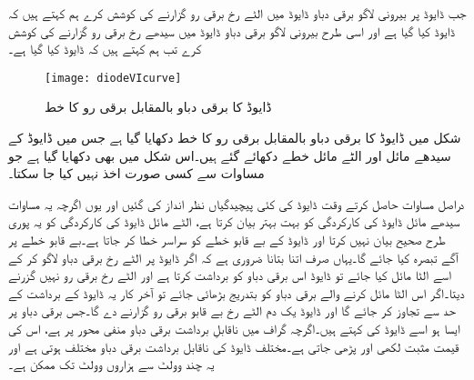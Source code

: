 جب ڈایوڈ پر بیرونی لاگو برقی دباو ڈایوڈ میں الٹے رخ برقی رو گزارنے کی کوشش کرے ہم کہتے ہیں کہ ڈایوڈ    کیا گیا ہے اور اسی طرح بیرونی لاگو برقی دباو ڈایوڈ میں سیدھے رخ برقی رو گزارنے کی کوشش کرے تب ہم کہتے ہیں کہ ڈایوڈ  کیا گیا ہے۔
\begin{figure}
\centering
\texttt{[image: diodeVIcurve]}
\caption{ڈایوڈ کا برقی دباو بالمقابل برقی رو کا خط}
\label{شکل_ڈایوڈ_برقی_دباو_بالمقابل_برقی_رو}
\end{figure}
شکل   میں ڈایوڈ کا برقی دباو بالمقابل برقی رو  کا خط دکھایا گیا ہے جس میں ڈایوڈ کے سیدھے مائل اور الٹے مائل خطے دکھائے گئے ہیں۔اس شکل میں  بھی دکھایا گیا ہے جو مساوات   سے کسی صورت اخذ نہیں کیا جا سکتا۔

دراصل مساوات   حاصل کرتے وقت ڈایوڈ کی کئی پیچیدگیاں نظر انداز کی گئیں اور یوں اگرچہ یہ مساوات سیدھے مائل ڈایوڈ کی کارکردگی کو بہت بہتر بیان کرتا ہے، الٹے مائل ڈایوڈ کی کارکردگی کو یہ پوری طرح صحیح بیان نہیں کرتا اور ڈایوڈ کے بے قابو خطے کو سراسر خطا کر جاتا ہے۔بے قابو خطے پر آگے تبصرہ کیا جائے گا۔یہاں صرف اتنا بتانا ضروری ہے کہ اگر ڈایوڈ پر الٹے رخ برقی دباو لاگو کر کے اسے الٹا مائل کیا جائے تو ڈایوڈ اس برقی دباو کو برداشت کرتا ہے اور الٹے رخ برقی رو نہیں گزرنے دیتا۔اگر اس الٹا مائل کرنے والے برقی دباو کو بتدریج بڑھائی جائے تو آخر کار یہ ڈایوڈ کے برداشت کے حد سے تجاوز کر جائے گا اور ڈایوڈ یک دم الٹے رخ بے قابو برقی رو گزارنے دے گا۔جس برقی دباو پر ایسا ہو اسے ڈایوڈ کی      کہتے ہیں۔اگرچہ گراف میں ناقابلِ برداشت برقی دباو منفی محور پر ہے، اس کی قیمت مثبت لکھی اور پڑھی جاتی ہے۔مختلف ڈایوڈ کی ناقابل برداشت برقی دباو مختلف ہوتی ہے اور یہ چند وولٹ سے ہزاروں وولٹ تک ممکن ہے۔


